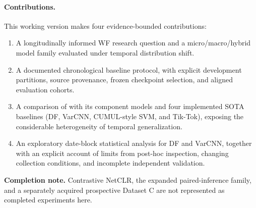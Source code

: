 \paragraph{Contributions.} This working version makes four evidence-bounded contributions:
\begin{enumerate}[leftmargin=*]
\item A longitudinally informed WF research question and a micro/macro/hybrid model family evaluated under temporal distribution shift.
\item A documented chronological baseline protocol, with explicit development partitions, source provenance, frozen checkpoint selection, and aligned evaluation cohorts.
\item A comparison of \Hybrid{} with its component models and four implemented SOTA baselines (DF, VarCNN, CUMUL-style SVM, and Tik-Tok), exposing the considerable heterogeneity of temporal generalization.
\item An exploratory date-block statistical analysis for DF and VarCNN, together with an explicit account of limits from post-hoc inspection, changing collection conditions, and incomplete independent validation.
\end{enumerate}

\noindent\textbf{Completion note.} Contrastive NetCLR, the expanded paired-inference family, and a separately acquired prospective Dataset C are not represented as completed experiments here.
